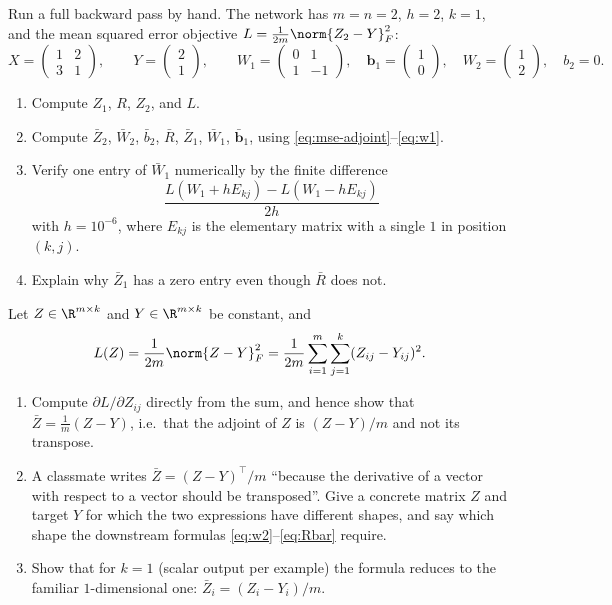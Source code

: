 \begin{exercise}\label{ex:ml-2}
Run a full backward pass by hand. The network has $m=n=2$, $h=2$, $k=1$, and
the mean squared error objective $L=\frac{1}{2m}\norm{Z_2-Y}_F^2$:
\[
  X=\begin{pmatrix}1&2\\3&1\end{pmatrix},\qquad
  Y=\begin{pmatrix}2\\1\end{pmatrix},\qquad
  W_1=\begin{pmatrix}0&1\\1&-1\end{pmatrix},\quad
  \mathbf{b}_1=\begin{pmatrix}1\\0\end{pmatrix},\quad
  W_2=\begin{pmatrix}1\\2\end{pmatrix},\quad
  b_2=0.
\]
\begin{enumerate}[label=(\alph*)]
  \item Compute $Z_1$, $R$, $Z_2$, and $L$.
  \item Compute $\bar Z_2$, $\bar W_2$, $\bar b_2$, $\bar R$, $\bar Z_1$,
    $\bar W_1$, $\bar{\mathbf b}_1$, using
    \eqref{eq:mse-adjoint}--\eqref{eq:w1}.
  \item Verify one entry of $\bar W_1$ numerically by the finite difference
    \[
      \frac{L(W_1+hE_{kj})-L(W_1-hE_{kj})}{2h}
    \]
    with $h=10^{-6}$, where $E_{kj}$ is the elementary matrix with a single $1$
    in position $(k,j)$.
  \item Explain why $\bar Z_1$ has a zero entry even though $\bar R$ does not.
\end{enumerate}
\end{exercise}

\begin{exercise}\label{ex:ml-3}
Let $Z\in\R^{m\times k}$ and $Y\in\R^{m\times k}$ be constant, and
\[
  L(Z)=\frac{1}{2m}\norm{Z-Y}_F^2=\frac{1}{2m}\sum_{i=1}^{m}\sum_{j=1}^{k}(Z_{ij}-Y_{ij})^2 .
\]
\begin{enumerate}[label=(\alph*)]
  \item Compute $\partial L/\partial Z_{ij}$ directly from the sum, and hence
    show that $\bar Z=\frac{1}{m}(Z-Y)$, i.e.\ that the adjoint of $Z$ is
    $(Z-Y)/m$ and not its transpose.
  \item A classmate writes $\bar Z=(Z-Y)^{\!\top}/m$ ``because the derivative of
    a vector with respect to a vector should be transposed''. Give a concrete
    matrix $Z$ and target $Y$ for which the two expressions have different
    shapes, and say which shape the downstream formulas
    \eqref{eq:w2}--\eqref{eq:Rbar} require.
  \item Show that for $k=1$ (scalar output per example) the formula reduces to
    the familiar $1$-dimensional one: $\bar Z_i=(Z_i-Y_i)/m$.
\end{enumerate}
\end{exercise}

